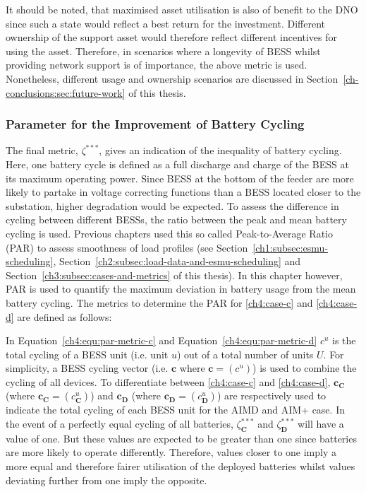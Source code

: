It should be noted, that maximised asset utilisation is also of benefit to the DNO since such a state would reflect a best return for the investment.
Different ownership of the support asset would therefore reflect different incentives for using the asset.
Therefore, in scenarios where a longevity of BESS whilst providing network support is of importance, the above metric is used.
Nonetheless, different usage and ownership scenarios are discussed in Section~\ref{ch-conclusions:sec:future-work} of this thesis.

\subsubsection{Parameter for the Improvement of Battery Cycling}

The final metric, $\zeta^{***}$, gives an indication of the inequality of battery cycling.
Here, one battery cycle is defined as a full discharge and charge of the BESS at its maximum operating power.
Since BESS at the bottom of the feeder are more likely to partake in voltage correcting functions than a BESS located closer to the substation, higher degradation would be expected.
To assess the difference in cycling between different BESSs, the ratio between the peak and mean battery cycling is used.
Previous chapters used this so called Peak-to-Average Ratio (PAR) to assess smoothness of load profiles (see Section~\ref{ch1:subsec:esmu-scheduling}, Section~\ref{ch2:subsec:load-data-and-esmu-scheduling} and Section~\ref{ch3:subsec:cases-and-metrics} of this thesis).
In this chapter however, PAR is used to quantify the maximum deviation in battery usage from the mean battery cycling.
The metrics to determine the PAR for \ref{ch4:case-c} and \ref{ch4:case-d} are defined as follows:




In Equation~\ref{ch4:equ:par-metric-c} and Equation~\ref{ch4:equ:par-metric-d} $c^u$ is the total cycling of a BESS unit (i.e. unit $u$) out of a total number of units $U$.
For simplicity, a BESS cycling vector (i.e. $\textbf{c}$ where $\textbf{c} = (c^u)$) is used to combine the cycling of all devices.
To differentiate between \ref{ch4:case-c} and \ref{ch4:case-d}, $\textbf{c}_\textbf{C}$ (where $\textbf{c}_\textbf{C} = (c^u_\textbf{C})$) and $\textbf{c}_\textbf{D}$ (where $\textbf{c}_\textbf{D} = (c^u_\textbf{D})$) are respectively used to indicate the total cycling of each BESS unit for the AIMD and AIM+ case.
In the event of a perfectly equal cycling of all batteries, $\zeta^{***}_\textbf{C}$ and $\zeta^{***}_\textbf{D}$ will have a value of one.
But these values are expected to be greater than one since batteries are more likely to operate differently.
Therefore, values closer to one imply a more equal and therefore fairer utilisation of the deployed batteries whilst values deviating further from one imply the opposite.
